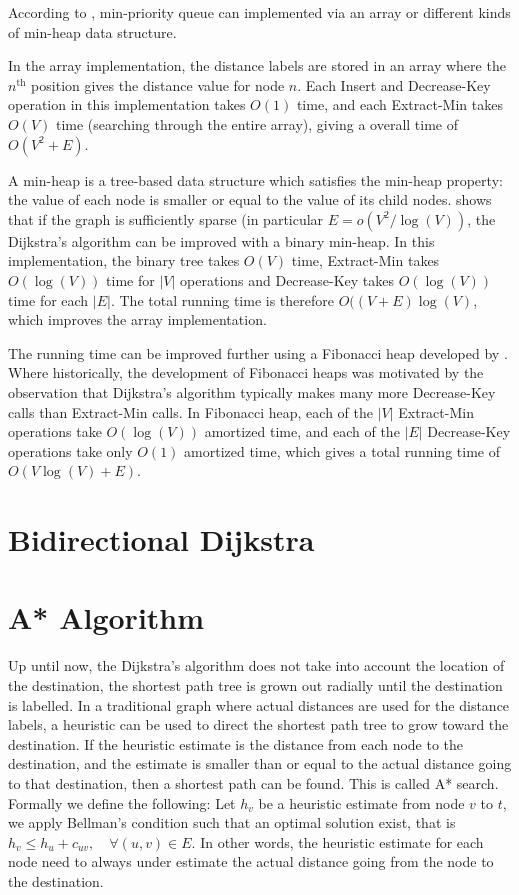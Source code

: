 According to \citet{Cormen},
min-priority queue can implemented via an array or different kinds of min-heap data structure.

In the array implementation,
the distance labels are stored in an array where the $n^{\text{th}}$ position gives the distance value for node $n$.
Each Insert and Decrease-Key operation in this implementation takes $O(1)$ time, and each Extract-Min takes $O(V)$ time (searching through the entire array), giving a overall time of $O(V^2 + E)$.

A min-heap is a tree-based data structure which satisfies the min-heap property:
the value of each node is smaller or equal to the value of its child nodes.
\citet{Cormen} shows that if the graph is sufficiently sparse (in particular $E = o(V^2/\log(V))$, the Dijkstra's algorithm can be improved with a binary min-heap. In this implementation, the binary tree takes $O(V)$ time, Extract-Min takes $O(\log(V))$ time for $|V|$ operations and Decrease-Key takes $O(\log(V))$ time for each $|E|$. The total running time is therefore $O((V+E)\log(V)$, which improves the array implementation.

The running time can be improved further using a Fibonacci heap
developed by \citet{Fredman}.
Where historically, the development of Fibonacci heaps was motivated by the observation that Dijkstra's algorithm typically makes many more Decrease-Key calls than Extract-Min calls.
In Fibonacci heap, each of the $|V|$ Extract-Min operations take $O(\log(V))$ amortized time,
and each of the $|E|$ Decrease-Key operations take only $O(1)$ amortized time,
which gives a total running time of $O(V\log(V)+E)$.

\section{Bidirectional Dijkstra}
\section{A* Algorithm}
Up until now,
the Dijkstra's algorithm does not take into account the location of the destination,
the shortest path tree is grown out radially until the destination is labelled.
In a traditional graph where actual distances are used for the distance labels,
a heuristic can be used to direct the shortest path tree to grow toward the destination.
If the heuristic estimate is the distance from each node to the destination,
and the estimate is smaller than or equal to the actual distance going to that destination,
then a shortest path can be found. This is called A* search.
Formally we define the following: Let $h_v$ be a heuristic estimate from node $v$ to $t$,
we apply Bellman's condition such that an optimal solution exist, that is 
$ h_v \leq h_u + c_{uv}, \quad \forall(u,v) \in E $.
In other words, the heuristic estimate for each node need to always under estimate the actual distance going from the node to the destination.

